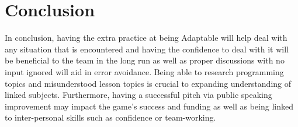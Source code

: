 \documentclass{scrartcl}
\begin{document}
\section{Conclusion}
In conclusion, having the extra practice at being Adaptable will help deal with any situation that is encountered and having the confidence to deal with it will be beneficial to the team in the long run as well as proper discussions with no input ignored will aid in error avoidance. Being able to research programming topics and misunderstood lesson topics is crucial to expanding understanding of linked subjects. Furthermore, having a successful pitch via public speaking improvement may impact the game's success and funding as well as being linked to inter-personal skills such as confidence or team-working.



\end{document}
